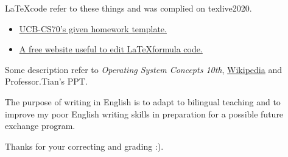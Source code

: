 \documentclass[11pt]{article}
\begin{document}
    \LaTeX \space code refer to these things and was complied on texlive2020.
    \begin{itemize}
        \item  \href{https://www.eecs70.org/assets/misc/homework_template.tex}{UCB-CS70's given homework template.} 
        \item  \href{https://www.latexlive.com}{A free website useful to edit \LaTeX \space formula code.}
    \end{itemize}

    Some description refer to \textit{Operating System Concepts 10th}, \href{https://en.wikipedia.org}{Wikipedia} and Professor.Tian's PPT.

    The purpose of writing in English is to adapt to bilingual teaching and to improve my poor English 
    writing skills in preparation for a possible future exchange program. 

    Thanks for your correcting and grading :).
\end{document}
